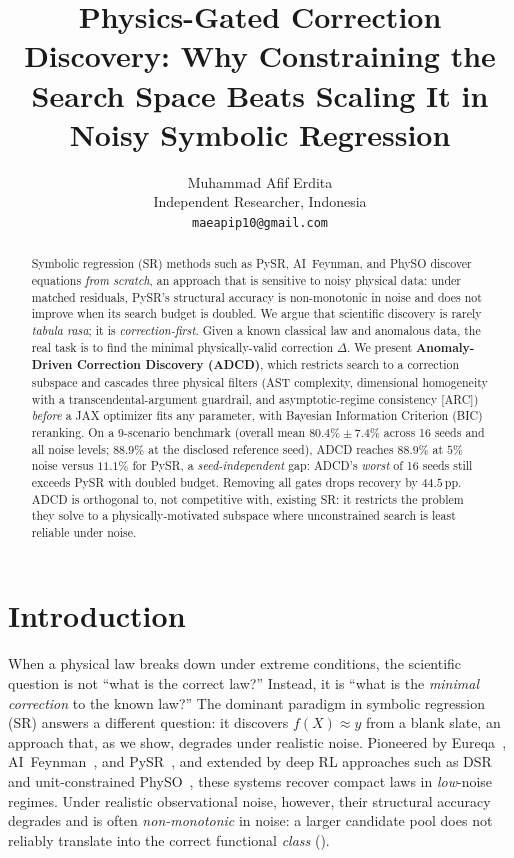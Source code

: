 \documentclass{article}
\title{Physics-Gated Correction Discovery: Why Constraining the Search Space Beats Scaling It in Noisy Symbolic Regression}
\author{%
  Muhammad Afif Erdita \\
  Independent Researcher, Indonesia \\
  \texttt{maeapip10@gmail.com}
}
\begin{document}
\maketitle

\begin{abstract}
Symbolic regression (SR) methods such as PySR, AI~Feynman, and PhySO discover equations \emph{from scratch}, an approach that is sensitive to noisy physical data: under matched residuals, PySR's structural accuracy is non-monotonic in noise and does not improve when its search budget is doubled. We argue that scientific discovery is rarely \emph{tabula rasa}; it is \emph{correction-first}. Given a known classical law and anomalous data, the real task is to find the minimal physically-valid correction $\Delta$. We present \textbf{Anomaly-Driven Correction Discovery (ADCD)}, which restricts search to a correction subspace and cascades three physical filters (AST complexity, dimensional homogeneity with a transcendental-argument guardrail, and asymptotic-regime consistency [ARC]) \emph{before} a JAX optimizer fits any parameter, with Bayesian Information Criterion (BIC) reranking. On a 9-scenario benchmark (overall mean $80.4\%\pm7.4\%$ across 16 seeds and all noise levels; $88.9\%$ at the disclosed reference seed), ADCD reaches $88.9\%$ at $5\%$ noise versus $11.1\%$ for PySR, a \emph{seed-independent} gap: ADCD's \emph{worst} of 16 seeds still exceeds PySR with doubled budget. Removing all gates drops recovery by $44.5$\,pp. ADCD is orthogonal to, not competitive with, existing SR: it restricts the problem they solve to a physically-motivated subspace where unconstrained search is least reliable under noise.
\end{abstract}


\section{Introduction}
\label{sec:intro}

When a physical law breaks down under extreme conditions, the scientific question is not ``what is the correct law?'' Instead, it is ``what is the \emph{minimal correction} to the known law?'' The dominant paradigm in symbolic regression (SR) answers a different question: it discovers $f(X)\approx y$ from a blank slate, an approach that, as we show, degrades under realistic noise. Pioneered by Eureqa~\cite{schmidt2009distilling}, AI~Feynman~\cite{udrescu2020ai}, and PySR~\cite{cranmer2020pysr}, and extended by deep RL approaches such as DSR~\cite{petersen2021deep} and unit-constrained PhySO~\cite{tenachi2023physo}, these systems recover compact laws in \emph{low}-noise regimes. Under realistic observational noise, however, their structural accuracy degrades and is often \emph{non-monotonic} in noise: a larger candidate pool does not reliably translate into the correct functional \emph{class} ().
\end{document}
